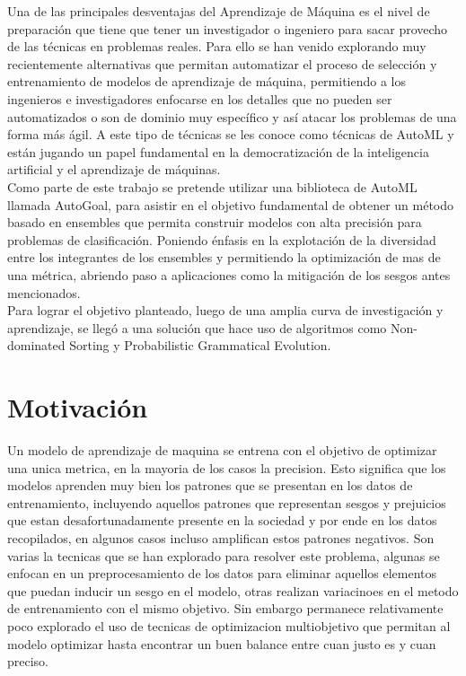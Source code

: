 \documentclass[runningheads,a4paper]{llncs}
\begin{document}
Una de las principales desventajas del Aprendizaje de Máquina es el nivel de preparación que tiene que
tener un investigador o ingeniero para sacar provecho de las técnicas en problemas reales.
Para ello se han venido explorando muy recientemente alternativas que permitan
automatizar el proceso de selección y entrenamiento de modelos de aprendizaje de máquina,
permitiendo a los ingenieros e investigadores enfocarse en los detalles que no pueden ser
automatizados o son de dominio muy específico y así atacar los problemas de una forma más
ágil. A este tipo de técnicas se les conoce como técnicas de AutoML y están jugando un
papel fundamental en la democratización de la inteligencia artificial y el aprendizaje de
máquinas.\\
Como parte de este trabajo se pretende utilizar una biblioteca de AutoML llamada AutoGoal, para asistir en el objetivo fundamental de
obtener un método basado en ensembles que permita construir modelos con alta precisión
para problemas de clasificación. Poniendo énfasis en la explotación de la diversidad entre los
integrantes de los ensembles y permitiendo la optimización de mas de una métrica, abriendo
paso a aplicaciones como la mitigación de los sesgos antes mencionados.\\
Para lograr el objetivo planteado, luego de una amplia curva de investigación y aprendizaje, se llegó a una solución que hace uso de algoritmos como Non-dominated Sorting y Probabilistic Grammatical Evolution.

\section*{Motivación}

Un modelo de aprendizaje de maquina se entrena con el objetivo de optimizar una unica metrica, en la mayoria de los casos la precision. Esto significa que los modelos aprenden muy bien los patrones que se presentan en los datos de entrenamiento, incluyendo aquellos patrones que representan sesgos y prejuicios que estan desafortunadamente presente en la sociedad y por ende en los datos recopilados, en algunos casos incluso amplifican estos patrones negativos. Son varias la tecnicas que se han explorado para resolver este problema, algunas se enfocan en un preprocesamiento de los datos para eliminar aquellos elementos que puedan inducir un sesgo en el modelo, otras realizan variacinoes en el metodo de entrenamiento con el mismo objetivo. Sin embargo permanece relativamente poco explorado el uso de tecnicas de optimizacion multiobjetivo que permitan al modelo optimizar hasta encontrar un buen balance entre cuan justo es y cuan preciso.
\end{document}
